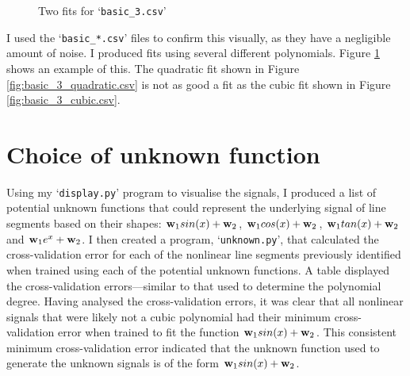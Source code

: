 \documentclass[onecolumn, 12pt, a4paper]{article}
\begin{document}
\begin{figure}[htbp]
    \centering
    \hfill
    \caption{Two fits for `\texttt{basic\_3.csv}'}
    \label{fig:basic_3.csv}
\end{figure}

I used the `\texttt{basic\_*.csv}' files to confirm this visually,
as they have a negligible amount of noise.
I produced fits using several different polynomials.
Figure \ref{fig:basic_3.csv} shows an example of this.
The quadratic fit shown in Figure \ref{fig:basic_3_quadratic.csv}
is not as good a fit as the cubic fit shown in Figure \ref{fig:basic_3_cubic.csv}.

\section{Choice of unknown function}

Using my `\texttt{display.py}' program to visualise the
signals, I produced a list of potential unknown functions
that could represent the underlying signal of line segments
based on their shapes:
$\vb{w}_{1}sin(x) + \vb{w}_{2}$,
$\vb{w}_{1}cos(x) + \vb{w}_{2}$,
$\vb{w}_{1}tan(x) + \vb{w}_{2}$ and
$\vb{w}_{1}e^{x} + \vb{w}_{2}$.
I then created a program, `\texttt{unknown.py}', that
calculated the cross-validation error for each of the
nonlinear line segments previously identified when
trained using each of the potential unknown functions.
A table displayed the cross-validation errors---similar 
to that used to determine the polynomial degree.
Having analysed the cross-validation errors, it was clear
that all nonlinear signals that were likely not
a cubic polynomial had their minimum cross-validation
error when trained to fit the function
$\vb{w}_{1}sin(x) + \vb{w}_{2}$.
This consistent minimum cross-validation error indicated
that the unknown function used to generate the unknown
signals is of the form $\vb{w}_{1}sin(x) + \vb{w}_{2}$.
\end{document}
